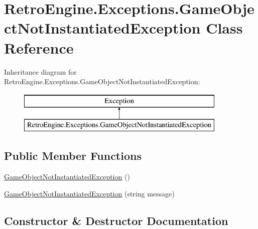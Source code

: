 \hypertarget{class_retro_engine_1_1_exceptions_1_1_game_object_not_instantiated_exception}{}\section{Retro\+Engine.\+Exceptions.\+Game\+Object\+Not\+Instantiated\+Exception Class Reference}
\label{class_retro_engine_1_1_exceptions_1_1_game_object_not_instantiated_exception}
Inheritance diagram for Retro\+Engine.\+Exceptions.\+Game\+Object\+Not\+Instantiated\+Exception\+:\begin{figure}[H]
\begin{center}
\leavevmode
\includegraphics[height=2.000000cm]{class_retro_engine_1_1_exceptions_1_1_game_object_not_instantiated_exception}
\end{center}
\end{figure}
\subsection*{Public Member Functions}
\begin{DoxyCompactItemize}
\item 
\mbox{\hyperlink{class_retro_engine_1_1_exceptions_1_1_game_object_not_instantiated_exception_a9bfa11917981c1651d39fef0e39a1fbe}{Game\+Object\+Not\+Instantiated\+Exception}} ()
\item 
\mbox{\hyperlink{class_retro_engine_1_1_exceptions_1_1_game_object_not_instantiated_exception_a79d460b48115cfdadf41adcf7beb9592}{Game\+Object\+Not\+Instantiated\+Exception}} (string message)
\end{DoxyCompactItemize}


\subsection{Constructor \& Destructor Documentation}
\mbox{\label{class_retro_engine_1_1_exceptions_1_1_game_object_not_instantiated_exception_a9bfa11917981c1651d39fef0e39a1fbe}} 
